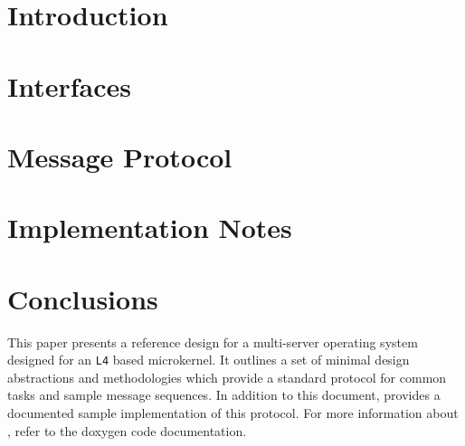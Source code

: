 \documentclass[a4paper,11pt,twoside]{report}
\begin{document}
\chapter{Introduction}
\setcounter{page}{1}
\label{s:intro}


\chapter{Interfaces}
\label{s:interface}


\chapter{Message Protocol}
\label{s:protocolip}


\chapter{Implementation Notes}
\label{s:implementation}


\chapter{\label{s:concl}Conclusions}

This paper presents a reference design for a multi-server operating system designed for an \texttt{L4} based microkernel. It outlines a set of minimal design abstractions and methodologies which provide a standard protocol for common tasks and sample message sequences. In addition to this document,  provides a documented sample implementation of this protocol. For more information about , refer to the doxygen code documentation.

%
%

\end{document}
